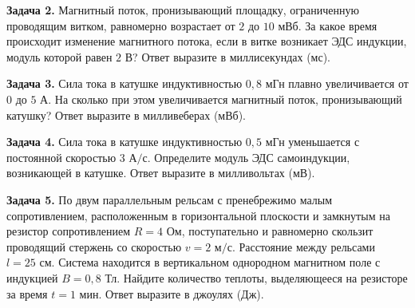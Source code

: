 \begin{taskbasic}[code={\label{task:elem_ind_v22_n12}}]
\textbf{Задача 2.} Магнитный поток, пронизывающий площадку, ограниченную проводящим витком, равномерно возрастает от $2$ до $10\text{ мВб}$. За какое время происходит изменение магнитного потока, если в витке возникает ЭДС индукции, модуль которой равен $2\text{ В}$? Ответ выразите в миллисекундах (мс).

\end{taskbasic}

\begin{taskbasic}[code={\label{task:elem_ind_v29_n12}}]
\textbf{Задача 3.} Сила тока в катушке индуктивностью $0{,}8\text{ мГн}$ плавно увеличивается от $0$ до $5\text{ А}$. На сколько при этом увеличивается магнитный поток, пронизывающий катушку? Ответ выразите в милливеберах (мВб).

\end{taskbasic}

\begin{taskbasic}[code={\label{task:elem_ind_v30_n12}}]
\textbf{Задача 4.} Сила тока в катушке индуктивностью $0{,}5\text{ мГн}$ уменьшается с постоянной скоростью $3\text{ А/с}$. Определите модуль ЭДС самоиндукции, возникающей в катушке. Ответ выразите в милливольтах (мВ).

\end{taskbasic}

\begin{taskbasic}[code={\label{task:elem_ind_v29_n23}}]
\textbf{Задача 5.} По двум параллельным рельсам с пренебрежимо малым сопротивлением, расположенным в горизонтальной плоскости и замкнутым на резистор сопротивлением $R = 4\text{ Ом}$, поступательно и равномерно скользит проводящий стержень со скоростью $v = 2\text{ м/с}$. Расстояние между рельсами $l = 25\text{ см}$. Система находится в вертикальном однородном магнитном поле с индукцией $B = 0{,}8\text{ Тл}$. Найдите количество теплоты, выделяющееся на резисторе за время $t = 1\text{ мин}$. Ответ выразите в джоулях (Дж).

\end{taskbasic}

